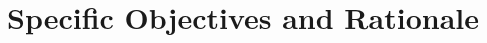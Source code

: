 \section{Specific Objectives and Rationale}
\begin{comment}
\textit{The objective of this research is to investigate whether XXX are a
cost-effective technology for supporting software testing. Towards this end, we set out
to extend the infrastructure provided by a JIT-enabled JVM with software testing support.
The rationale behind arguing that HLL VMs provide a sound basis for building an
integrated mutation testing environment is that they bear a repertoire of runtime data
structures suitable for accommodating the semantics of mutation testing. First, by capitalizing on existing runtime structures it is possible to decrease the amount of storage
space required to implement weak mutation: from within the execution environment it is
easier to determine what needs to be copied, narrowing the scope down and thus reducing
storage requirements. Second, there is no need to resort to costly reflective operations since
runtime information are readily available at HLL VM level. Third, by reifying mutation
analysis concepts (i.e., turning them into first-class citizens within the scope of HLL VMs)
it is easier to take advantage of high-end optimization and memory management features
7Chapter 1 | Introduction
which are common in mainstream HLL VM implementations, e.g., just-in-time (JIT) compilation and garbage collection (GC). Lastly, a further advantage of building on HLL VMs
data structures is that they make it possible to exert greater control over the execution of
mutants.
As stated, the inherent non-determinism of concurrent programs makes software testing
and debugging even more challenging. Therefore, a key missing element in modern execution environments is the ability to deterministically re-execute multithreaded programs.
Since HLL VMs are the locus of control during execution, we conjecture that these execution environments contain facilities that can be extended to prune away non-deterministic
behavior and enforce that subsequent executions cover distinct thread schedules from the
ones previously run.
The rationale behind settling on using a JVM realization to implement our VM-based
mutation analysis environment is that, apart from being by far the most used HLL VM
implementation within academic circles (Durelli et al., 2010), implementations of such
execution environment have sophisticated, built-in multithread support. This makes for
an infrastructure more suited to our integrated software testing environment because both
the fork-and-join model to speed up mutants execution and the deterministic replayer
heavily rely on thread support.}
\end{comment}

